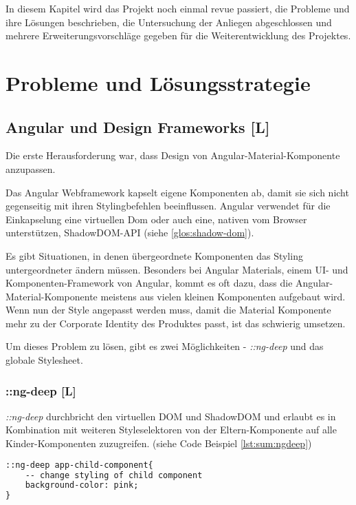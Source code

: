 In diesem Kapitel wird das Projekt noch einmal revue passiert, die Probleme und ihre Lösungen beschrieben, die Untersuchung der Anliegen abgeschlossen und mehrere Erweiterungsvorschläge gegeben für die Weiterentwicklung des Projektes.

\section{Probleme und Lösungsstrategie}
\subsection{Angular und Design Frameworks [L]}
Die erste Herausforderung war, dass Design von Angular-Material-Komponente anzupassen.

Das Angular Webframework kapselt eigene Komponenten ab, damit sie sich nicht gegenseitig mit ihren Stylingbefehlen beeinflussen. Angular verwendet für die Einkapselung eine virtuellen Dom oder auch eine, nativen vom Browser unterstützen, ShadowDOM-API (siehe \ref{glos:shadow-dom}).
\cite{AngularViewencapsulation}

Es gibt Situationen, in denen übergeordnete Komponenten das Styling untergeordneter ändern müssen. Besonders bei Angular Materials, einem UI- und Komponenten-Framework von Angular, kommt es oft dazu, dass die Angular-Material-Komponente meistens aus vielen kleinen Komponenten aufgebaut wird. Wenn nun der Style angepasst werden muss, damit die Material Komponente mehr zu der Corporate Identity des Produktes passt, ist das schwierig umsetzen.

Um dieses Problem zu lösen, gibt es zwei Möglichkeiten - \emph{::ng-deep} und das globale Stylesheet.

\subsubsection{::ng-deep [L]}
\emph{::ng-deep} durchbricht den virtuellen DOM und ShadowDOM und erlaubt es in Kombination mit weiteren Styleselektoren von der Eltern-Komponente auf alle Kinder-Komponenten zuzugreifen. (siehe Code Beispiel \ref{lst:sum:ngdeep})

\begin{lstlisting}[caption={{Parent.component.scss - Changing Styling in Child Componentes by using :ngdeep}},language=HTML,label=lst:sum:ngdeep]
::ng-deep app-child-component{
    -- change styling of child component
    background-color: pink;
}    
\end{lstlisting}

